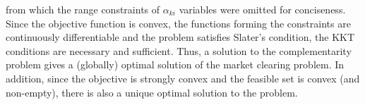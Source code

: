 \documentclass{article}
\begin{document}
from which the range constraints of $\alpha_{ki}$ variables were omitted for conciseness. Since the objective function is convex, the functions forming the constraints are continuously differentiable and the problem satisfies Slater's condition, the KKT conditions are necessary and sufficient. Thus, a solution to the complementarity problem gives a (globally) optimal solution of the market clearing problem. In addition, since the objective is strongly convex and the feasible set is convex (and non-empty), there is also a unique optimal solution to the problem.


\end{document}
